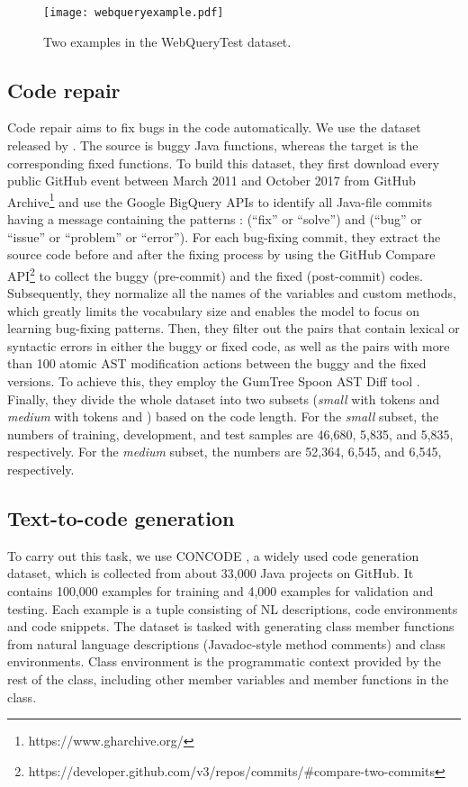 \documentclass[sigconf,nonacm,screen]{acmart}
\begin{document}
\begin{figure}
    \texttt{[image: webqueryexample.pdf]}
    \caption{Two examples in the WebQueryTest dataset.}
    \label{fig:webqueryexample}
\end{figure}


\subsection{Code repair}
\label{code_repair}
Code repair aims to fix bugs in the code automatically. We use the dataset released by \citet{tufano2019empirical}. The source is buggy Java functions, whereas the target is the corresponding fixed functions. 
To build this dataset, they first download every public GitHub event between March 2011 and October 2017 from GitHub Archive\footnote{https://www.gharchive.org/} and use the Google BigQuery APIs to identify all Java-file commits having a message containing the patterns \cite{fischer2003populating}: (“fix” or “solve”) and (“bug” or “issue” or “problem” or “error”). For each bug-fixing commit, they extract the source code before and after the fixing process by using the GitHub Compare API\footnote{https://developer.github.com/v3/repos/commits/\#compare-two-commits} to collect the buggy (pre-commit) and the fixed (post-commit) codes. Subsequently, they normalize all the names of the variables and custom methods, which greatly limits the vocabulary size and enables the model to focus on learning bug-fixing patterns. Then, they filter out the pairs that contain lexical or syntactic errors in either the buggy or fixed code, as well as the pairs with more than 100 atomic AST modification actions between the buggy and the fixed versions.
To achieve this, they employ the GumTree Spoon AST Diff tool \cite{falleri2014fine}. 
Finally, they divide the whole dataset into two subsets (\textit{small} with tokens  and \textit{medium} with tokens  and ) based on the code length. For the \textit{small} subset, the numbers of training, development, and test samples are 46,680, 5,835, and 5,835, respectively. For the \textit{medium} subset, the numbers are 52,364, 6,545, and 6,545, respectively.

\subsection{Text-to-code generation}
To carry out this task, we use CONCODE \cite{iyer2018mapping}, a widely used code generation dataset, which is collected from about 33,000 Java projects on GitHub. It contains 100,000 examples for training and 4,000 examples for validation and testing. Each example is a tuple consisting of NL descriptions, code environments and code snippets. The dataset is tasked with generating class member functions from natural language descriptions (Javadoc-style method comments) and class environments. Class environment is the programmatic context provided by the rest of the class, including other member variables and member functions in the class. 
\end{document}
